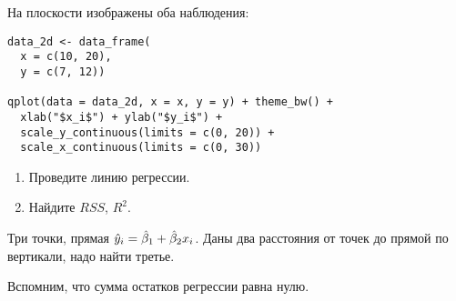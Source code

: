 \begin{problem}
На плоскости изображены оба наблюдения:

\begin{verbatim}
data_2d <- data_frame(
  x = c(10, 20),
  y = c(7, 12))

qplot(data = data_2d, x = x, y = y) + theme_bw() +
  xlab("$x_i$") + ylab("$y_i$") +
  scale_y_continuous(limits = c(0, 20)) +
  scale_x_continuous(limits = c(0, 30))
\end{verbatim}



\begin{minipage}{0.6\textwidth}
\begin{center}
\begin{tikzpicture}[scale = 0.025]

\end{tikzpicture}
\end{center}
\end{minipage}

\begin{enumerate}
\item Проведите линию регрессии.
\item Найдите $RSS$, $R^2$.
\end{enumerate}

\begin{sol}
\end{sol}
\end{problem}


\begin{problem}
Три точки, прямая $\hy_i = \hb_1 + \hb_2 x_i$. Даны два расстояния от точек до прямой по вертикали, надо найти третье.
\begin{sol}
Вспомним, что сумма остатков регрессии равна нулю.
\end{sol}
\end{problem}

